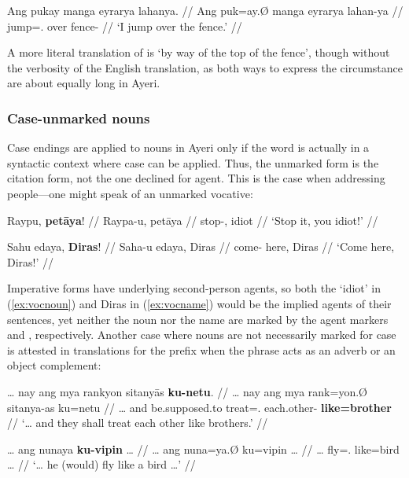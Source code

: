 \ex\begingl
	\gla Ang pukay manga eyrarya lahanya. //
	\glb Ang puk=ay.Ø manga eyrarya lahan-ya //
	\glc \AgtT{} jump=\Fsg{}.\Top{} \Dyn{} over fence-\Loc{} //
	\glft `I jump over the fence.' //
\endgl\xe

A more literal translation of  is `by 
way of the top of the fence', though without the verbosity of the English 
translation, as both ways to express the circumstance are about equally long in 
Ayeri.


\subsubsection{Case-unmarked nouns}
\label{subsec:uncased}

Case endings are applied to nouns in Ayeri only if the word is actually in a 
syntactic context where case can be applied. Thus, the unmarked form is the 
citation form, not the one declined for agent. This is the case when addressing 
people---one might speak of an unmarked vocative:

\pex
\a\label{ex:vocnoun}\begingl
	\gla Raypu, \textbf{petāya}! //
	\glb Raypa-u, petāya //
	\glc stop-\Imp{}, idiot //
	\glft `Stop it, you idiot!' //
\endgl

\a\label{ex:vocname}\begingl
	\gla Sahu edaya, \textbf{Diras}! //
	\glb Saha-u edaya, Diras //
	\glc come-\Imp{} here, Diras //
	\glft `Come here, Diras!' //
\endgl
\xe

Imperative forms have underlying second-person agents, so both the `idiot' in 
(\ref{ex:vocnoun}) and Diras in (\ref{ex:vocname}) would be the implied agents 
of their sentences, yet neither the noun nor the name are marked by the agent 
markers  and , respectively. Another case where 
nouns are not necessarily marked for case is attested in translations for the 
prefix  when the phrase acts as an adverb or an 
object complement:

\pex
\a\label{ex:kuudhr}\begingl
	\gla … nay ang mya rankyon sitanyās \textbf{ku-netu}. //
	\glb … nay ang mya rank=yon.Ø sitanya-as ku=netu //
	\glc … and \AgtT{} be.supposed.to treat=\TplN{}.\Top{} 
		each.other-\Parg{} \textbf{like=brother} //
	\glft `… and they shall treat each other like brothers.'\footnotemark%
	//
\endgl

\a\label{ex:kukafka}\begingl
	\gla … ang nunaya \textbf{ku-vipin} … //
	\glb … ang nuna=ya.Ø ku=vipin … //
	\glc … \AgtT{} fly=\TsgM{}.\Top{} like=bird … //
	\glft `… he (would) fly like a bird …'%
	//
\endgl

